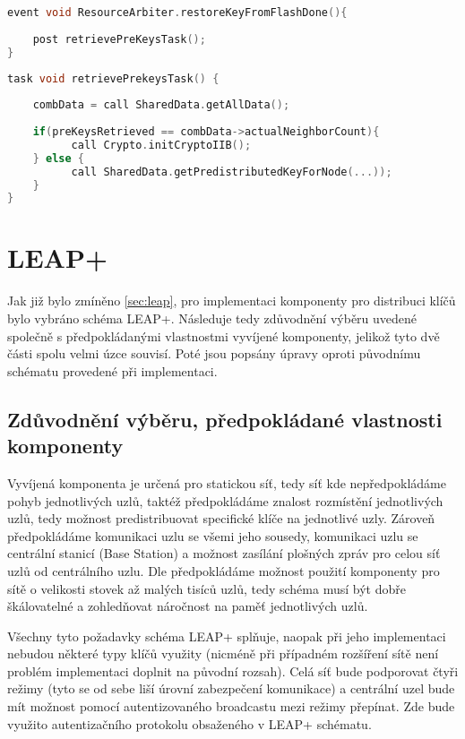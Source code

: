 \documentclass[11pt,final,twoside]{fithesis2}
\begin{document}
\begin{lstlisting}[float, language=C,caption=Ukázka události (event),label=code:event]
event void ResourceArbiter.restoreKeyFromFlashDone(){	
	
	post retrievePreKeysTask();		
}
\end{lstlisting}

\begin{lstlisting}[float, language=C,caption=Ukázka úkolu (task),label=code:task]
task void retrievePrekeysTask() {
 
	combData = call SharedData.getAllData();
	
	if(preKeysRetrieved == combData->actualNeighborCount){
	      call Crypto.initCryptoIIB();
	} else {
	      call SharedData.getPredistributedKeyForNode(...));	      
	}
}
\end{lstlisting}



\section{LEAP+}
Jak již bylo zmíněno \ref{sec:leap}, pro implementaci komponenty pro distribuci klíčů bylo vybráno schéma LEAP+. Následuje tedy zdůvodnění výběru uvedené společně s předpokládanými vlastnostmi 
vyvíjené komponenty, jelikož tyto dvě části spolu velmi úzce souvisí. Poté jsou popsány úpravy oproti původnímu schématu provedené při implementaci. 
\subsection{Zdůvodnění výběru, předpokládané vlastnosti komponenty}

Vyvíjená komponenta je určená pro statickou síť, tedy síť kde nepředpokládáme pohyb jednotlivých uzlů, taktéž předpokládáme znalost rozmístění jednotlivých uzlů, tedy možnost predistribuovat specifické
klíče na jednotlivé uzly. Zároveň předpokládáme komunikaci uzlu se všemi jeho sousedy, komunikaci uzlu se centrální stanicí 
(Base Station) a možnost zasílání plošných zpráv pro celou síť uzlů od centrálního uzlu. Dle předpokládáme možnost použití komponenty pro sítě o velikosti stovek až malých tisíců uzlů, tedy schéma musí 
být dobře škálovatelné a zohledňovat náročnost na paměť jednotlivých uzlů. 

Všechny tyto požadavky schéma LEAP+ splňuje, naopak při jeho implementaci nebudou některé typy klíčů využity (nicméně při případném rozšíření sítě není problém implementaci doplnit na původní rozsah). 
Celá síť bude podporovat čtyři režimy (tyto se od sebe liší úrovní zabezpečení komunikace) a centrální uzel bude mít možnost pomocí autentizovaného broadcastu mezi režimy přepínat. Zde bude využito 
autentizačního protokolu obsaženého v LEAP+ schématu. 
\end{document}
